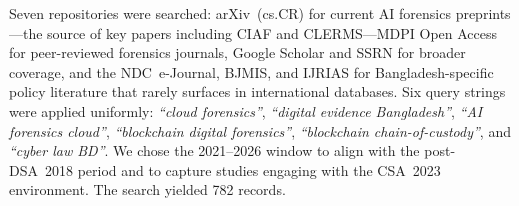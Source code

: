 \documentclass[sigconf,nonacm]{acmart}
\begin{document}
Seven repositories were searched: arXiv~(cs.CR) for current AI forensics
preprints---the source of key papers including CIAF and CLERMS---MDPI
Open Access for peer-reviewed forensics journals, Google Scholar and SSRN
for broader coverage, and the NDC~e-Journal, BJMIS, and IJRIAS for
Bangladesh-specific policy literature that rarely surfaces in
international databases. Six query strings were applied uniformly:
\textit{``cloud forensics''}, \textit{``digital evidence Bangladesh''},
\textit{``AI forensics cloud''}, \textit{``blockchain digital
forensics''}, \textit{``blockchain chain-of-custody''}, and
\textit{``cyber law BD''}. We chose the 2021--2026 window to align with
the post-DSA~2018 period and to capture studies engaging with the
CSA~2023 environment. The search yielded 782 records.

\end{document}
